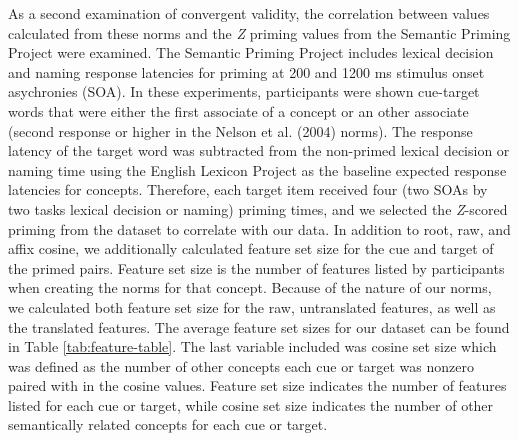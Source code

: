 \documentclass[english,man]{apa6}
\theoremstyle{definition}
\theoremstyle{definition}
\theoremstyle{definition}
\theoremstyle{remark}
\begin{document}
As a second examination of convergent validity, the correlation between
values calculated from these norms and the \emph{Z} priming values from
the Semantic Priming Project were examined. The Semantic Priming Project
includes lexical decision and naming response latencies for priming at
200 and 1200 ms stimulus onset asychronies (SOA). In these experiments,
participants were shown cue-target words that were either the first
associate of a concept or an other associate (second response or higher
in the Nelson et al. (2004) norms). The response latency of the target
word was subtracted from the non-primed lexical decision or naming time
using the English Lexicon Project as the baseline expected response
latencies for concepts. Therefore, each target item received four (two
SOAs by two tasks lexical decision or naming) priming times, and we
selected the \emph{Z}-scored priming from the dataset to correlate with
our data. In addition to root, raw, and affix cosine, we additionally
calculated feature set size for the cue and target of the primed pairs.
Feature set size is the number of features listed by participants when
creating the norms for that concept. Because of the nature of our norms,
we calculated both feature set size for the raw, untranslated features,
as well as the translated features. The average feature set sizes for
our dataset can be found in Table \ref{tab:feature-table}. The last
variable included was cosine set size which was defined as the number of
other concepts each cue or target was nonzero paired with in the cosine
values. Feature set size indicates the number of features listed for
each cue or target, while cosine set size indicates the number of other
semantically related concepts for each cue or target.
\end{document}
